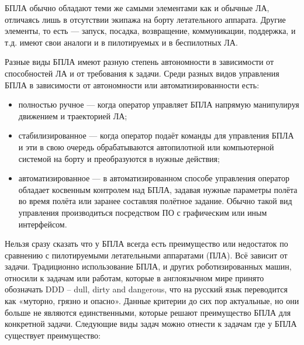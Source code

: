 \documentclass[specification,annotation]{itmo-student-thesis}
\begin{document}
БПЛА обычно обладают теми же самыми элементами как и обычные ЛА, отличаясь лишь
в отсутствии экипажа на борту летательного аппарата. Другие элементы, то есть ---
запуск, посадка, возвращение, коммуникации, поддержка, и т.д. имеют свои аналоги
и в пилотируемых и в беспилотных ЛА.\cite{austin-uas}

Разные виды БПЛА имеют разную степень автономности в зависимости от способностей
ЛА и от требования к задачи. Среди разных видов управления БПЛА в зависимости от
автономности или автоматизированности есть\cite{douglas-intro-to-uas}:

\begin{itemize}
  \item полностью ручное --- когда оператор управляет БПЛА напрямую манипулируя
    движением и траекторией ЛА;
  \item стабилизированное --- когда оператор подаёт команды для управления БПЛА и
    эти в свою очередь обрабатываются автопилотной или компьютерной системой на
    борту и преобразуются в нужные действия;
  \item автоматизированное --- в автоматизированном способе управления оператор
    обладает косвенным контролем над БПЛА, задавая нужные параметры полёта во
    время полёта или заранее составляя полётное задание. Обычно такой вид
    управления производиться посредством ПО с графическим или иным интерфейсом.
\end{itemize}

Нельзя сразу сказать что у БПЛА всегда есть преимущество или недостаток по
сравнению с пилотируемыми летательными аппаратами (ПЛА). Всё зависит от задачи.
Традиционно использование БПЛА, и других роботизированных машин, относили к
задачам или работам, которые в англоязычном мире принято обозначать DDD -- dull,
dirty and dangerous, что на русский язык переводится как «муторно, грязно и
опасно». Данные критерии до сих пор актуальные, но они больше не являются
единственными, которые решают преимущество БПЛА для конкретной задачи. Следующие
виды задач можно отнести к задачам где у БПЛА существует преимущество:
\end{document}
